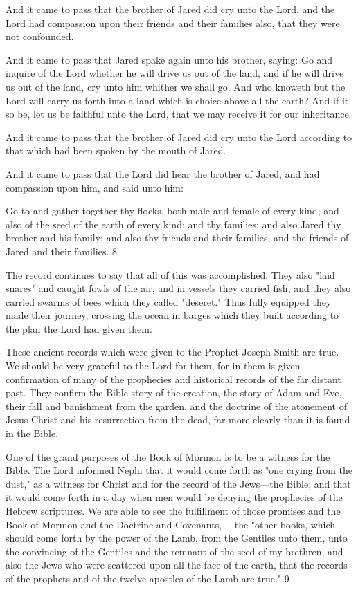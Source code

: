 And it came to pass that the brother of Jared did cry unto the Lord, and the Lord had
compassion upon their friends and their families also, that they were not confounded.

And it came to pass that Jared spake again unto his brother, saying: Go and inquire of the
Lord whether he will drive us out of the land, and if he will drive us out of the land, cry unto
him whither we shall go. And who knoweth but the Lord will carry us forth into a land which
is choice above all the earth? And if it so be, let us be faithful unto the Lord, that we may
receive it for our inheritance.

And it came to pass that the brother of Jared did cry unto the Lord according to that which
had been spoken by the mouth of Jared.

And it came to pass that the Lord did hear the brother of Jared, and had compassion upon
him, and said unto him:

Go to and gather together thy flocks, both male and female of every kind; and also of the
seed of the earth of every kind; and thy families; and also Jared thy brother and his family;
and also thy friends and their families, and the friends of Jared and their families. 8

The record continues to say that all of this was accomplished. They also "laid snares" and
caught fowls of the air, and in vessels they carried fish, and they also carried swarms of bees
which they called "deseret." Thus fully equipped they made their journey, crossing the ocean
in barges which they built according to the plan the Lord had given them.

These ancient records which were given to the Prophet Joseph Smith are true. We should be
very grateful to the Lord for them, for in them is given confirmation of many of the
prophecies and historical records of the far distant past. They confirm the Bible story of the
creation, the story of Adam and Eve, their fall and banishment from the garden, and the
doctrine of the atonement of Jesus Christ and his resurrection from the dead, far more clearly
than it is found in the Bible.

One of the grand purposes of the Book of Mormon is to be a witness for the Bible. The Lord
informed Nephi that it would come forth as "one crying from the dust," as a witness for
Christ and for the record of the Jews—the Bible; and that it would come forth in a day when
men would be denying the prophecies of the Hebrew scriptures. We are able to see the
fulfillment of those promises and the Book of Mormon and the Doctrine and Covenants,—
the "other books, which should come forth by the power of the Lamb, from the Gentiles unto
them, unto the convincing of the Gentiles and the remnant of the seed of my brethren, and
also the Jews who were scattered upon all the face of the earth, that the records of the
prophets and of the twelve apostles of the Lamb are true." 9

